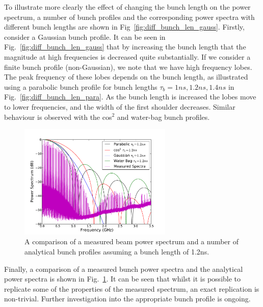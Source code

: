 \documentclass{cernrep}
\begin{document}
To illustrate more clearly the effect of changing the bunch length on the power spectrum, a number of bunch profiles and the corresponding power spectra with different bunch lengths are shown in Fig~\ref{fig:diff_bunch_len_gauss}. Firstly, consider a Gaussian bunch profile. It can be seen in Fig.~\ref{fig:diff_bunch_len_gauss} that by increasing the bunch length that the magnitude at high frequencies is decreased quite substantially. If we consider a finite bunch profile (non-Gaussian), we note that we have high frequency lobes. The peak frequency of these lobes depends on the bunch length, as illustrated using a parabolic bunch profile for bunch lengths $\tau_{b} = 1ns, 1.2ns, 1.4ns$ in Fig.~\ref{fig:diff_bunch_len_para}. As the bunch length is increased the lobes move to lower frequencies, and the width of the first shoulder decreases. Similar behaviour is observed with the cos$^{2}$ and water-bag bunch profiles.

\begin{figure}
\begin{center}
\includegraphics[width=0.65\textwidth]{figures/beam_spectra_power_12ns.pdf}
\end{center}
\caption{A comparison of a measured beam power spectrum and a number of analytical bunch profiles assuming a bunch length of 1.2ns.}
\label{fig:power_all}
\end{figure}

Finally, a comparison of a measured bunch power spectra and the analytical power spectra is shown in Fig.~\ref{fig:power_all}. It can be seen that whilst it is possible to replicate some of the properties of the measured spectrum, an exact replication is non-trivial. Further investigation into the appropriate bunch profile is ongoing.



\end{document}
